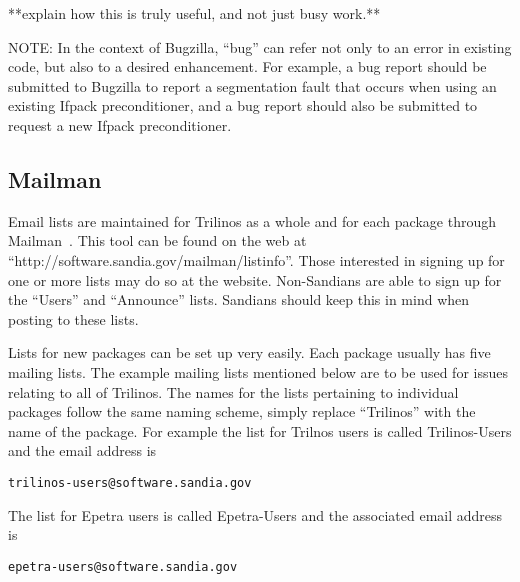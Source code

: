 \documentclass[12pt,relax]{SANDreport}
\begin{document}
**explain how this is truly useful, and not just busy work.**

NOTE: In the context of Bugzilla, ``bug'' can refer not only to an error in 
existing code, but also to a desired enhancement.  For example, a bug report 
should be submitted to Bugzilla to report a segmentation fault that occurs 
when using an existing Ifpack preconditioner, and a bug report should also be
submitted to request a new Ifpack preconditioner.

\subsection{Mailman}

Email lists are maintained for Trilinos as a whole and for each package 
through Mailman~\cite{Mailman}.  This tool can be found on the web at 
``http://software.sandia.gov/mailman/listinfo''.  Those interested in signing 
up for one or more lists may do so at the website.  Non-Sandians are able to 
sign up for the ``Users'' and ``Announce'' lists.  Sandians should keep this 
in mind when posting to these lists.

Lists for new packages can be set up very easily.  Each package usually has 
five mailing lists.  The example mailing lists mentioned below are to be used 
for issues relating to all of Trilinos.  The names for the lists pertaining to 
individual packages follow the same naming scheme, simply replace ``Trilinos'' 
with the name of the package.  For example the list for Trilnos users is 
called Trilinos-Users and the email address is 
\begin{verbatim}trilinos-users@software.sandia.gov\end{verbatim}  The list 
for Epetra users is called Epetra-Users and the associated email address is 
\begin{verbatim}epetra-users@software.sandia.gov\end{verbatim}
\end{document}
